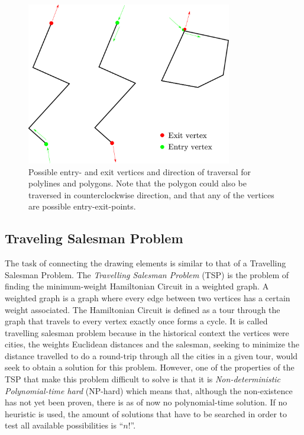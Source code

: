 \begin{figure}
\centering
\includegraphics[width=0.8\textwidth]{images/path_planning/traversal.pdf}
\caption{Possible entry- and exit vertices and direction of traversal for polylines and polygons. Note that the polygon could also be traversed in counterclockwise direction, and that any of the vertices are possible entry-exit-points.}\label{fig:connect}
\end{figure}

\subsection{Traveling Salesman Problem}

The task of connecting the drawing elements is similar to that of a Travelling Salesman Problem.
The \textit{Travelling Salesman Problem} (TSP) is the problem of finding the minimum-weight Hamiltonian Circuit in a weighted graph. A weighted graph is a graph where every edge between two vertices has a certain weight associated. The Hamiltonian Circuit is defined as a tour through the graph that travels to every vertex exactly once forms a cycle. It is called travelling salesman problem because in the historical context the vertices were cities, the weights Euclidean distances and the salesman, seeking to minimize the distance travelled to do a round-trip through all the cities in a given tour, would seek to obtain a solution for this problem. However, one of the properties of the TSP that make this problem difficult to solve is that it is \textit{Non-deterministic Polynomial-time hard} (NP-hard) which means that, although the non-existence has not yet been proven, there is as of now no polynomial-time solution. If no heuristic is used, the amount of solutions that have to be searched in order to test all available possibilities is \enquote{$n!$}.

